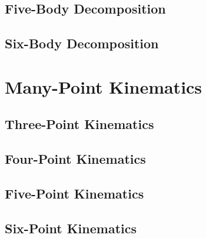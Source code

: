 \documentclass[letterpaper, 12pt]{report}
\begin{document}
\chapter{Five-Body Decomposition}
\chapter{Six-Body Decomposition}

\part{Many-Point Kinematics}

\chapter{Three-Point Kinematics}
\chapter{Four-Point Kinematics}
\chapter{Five-Point Kinematics}
\chapter{Six-Point Kinematics}
\end{document}
